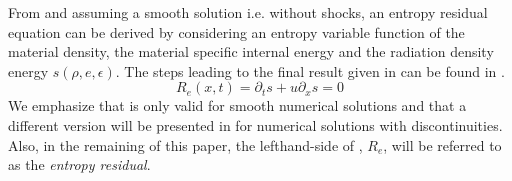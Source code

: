 \documentclass[review]{elsarticle}
\begin{document}
From  and assuming a smooth solution i.e. without shocks, an entropy residual equation can be derived by considering an entropy variable function of the material density, the material specific internal energy and the radiation density energy $s(\rho, e, \epsilon)$. The steps leading to the final result given in  can be found in \cite{our_jcp_radhy_paper}.
%
\begin{equation}\label{eq:GRH-entropy}
R_e(x,t) = \partial_t s + u \partial_x s = 0
\end{equation}
%
We emphasize that  is only valid for smooth numerical solutions and that a different version will be presented in  for numerical solutions with discontinuities. Also, in the remaining of this paper, the lefthand-side of , $R_e$, will be referred to as the \emph{entropy residual}.
%
\end{document}
